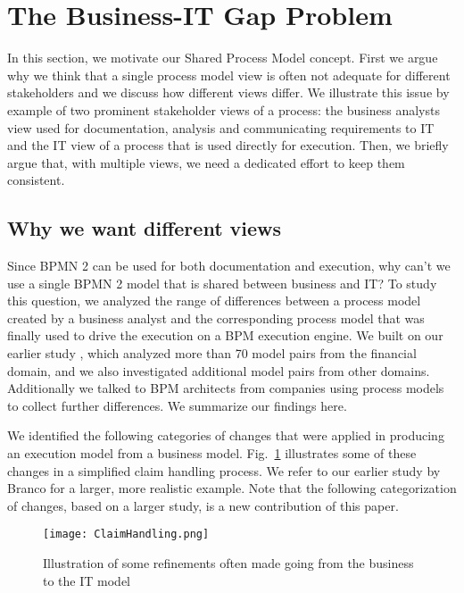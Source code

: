 \section{The Business-IT Gap Problem}
\label{sec:BITGap}

In this section, we motivate our Shared Process Model concept. First we argue why we think that a single process model view is often not adequate for different stakeholders and we discuss how different views differ. We illustrate this issue by example of two prominent stakeholder views of a process: the business analysts view used for documentation, analysis and communicating requirements to IT and the IT view of a process that is used directly for execution. Then, we briefly argue that, with multiple views, we need a dedicated effort to keep them consistent.
  
  
\subsection{Why we want different views}
\label{sec:BITGap1}
 

Since BPMN 2 can be used for both documentation and execution, why can't we use a single BPMN 2 model that is shared between business and IT? To study this question, we analyzed the range of differences between a process model created by a business analyst and the corresponding process model that was finally used to drive the execution on a BPM execution engine. We built on our earlier study \etal \cite{BXC+12}, which analyzed more than 70 model pairs from the financial domain, and we also investigated additional model pairs from other domains.  Additionally we talked to BPM architects from companies using process models to collect further differences. We summarize our findings here. 

We identified the following categories of changes that were applied in producing an execution model from a business model. Fig.~\ref{fig:example} illustrates some of these changes in a simplified claim handling process. We refer to our earlier study by Branco \etal \cite{BXC+12} for a larger, more realistic example. Note that the following categorization of changes, based on a larger study, is a new contribution of this paper.

\begin{figure}[bt]
\begin{center}
\vspace{-0.5cm}
\texttt{[image: ClaimHandling.png]} %
\caption{Illustration of some refinements often made going from the business to the IT model}
\label{fig:example}
\vspace{-0.5cm}
\end{center}
\end{figure}
%

